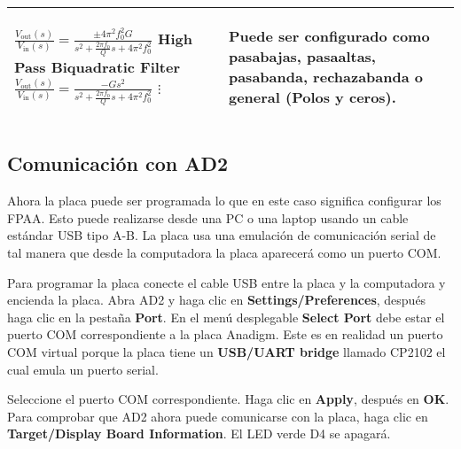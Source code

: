 \begin{table}[!ht]
\begin{tabular}{>{\centering\arraybackslash}m{3cm} >{\centering\arraybackslash}m{5cm} >{\centering\arraybackslash}m{5cm}}
\begin{scriptsize}
      	 $\frac{V_{\mathrm{out}}(s)}{V_{\mathrm{in}}(s)} = \frac{\pm 4 \pi^{2} f_{0}^{2} G}{s^{2} + \frac{2 \pi f_{0}}{Q}s + 4 \pi^{2} f_{0}^{2}}$ \linebreak
      	 \textbf{High Pass Biquadratic Filter} \linebreak
      	 $\frac{V_{\mathrm{out}}(s)}{V_{\mathrm{in}}(s)} = \frac{-G s^{2}}{s^{2} + \frac{2 \pi f_{0}}{Q} s + 4 \pi^{2} f_{0}^{2}}$ \linebreak
      	 $\vdots$
      \end{scriptsize}
    & 
      \begin{itemize}[leftmargin=0cm,noitemsep]
      \begin{scriptsize}
		\item[] Puede ser configurado como pasabajas, pasaaltas, pasabanda, rechazabanda o general (Polos y ceros).
      \end{scriptsize}
      \end{itemize}
    \\ %
    \hline
  \end{tabular}
\end{table}
	
	\subsection{Comunicación con AD2}

Ahora la placa puede ser programada lo que en este caso significa configurar los FPAA. Esto puede realizarse desde una PC o una laptop usando un cable estándar USB tipo A-B. La placa usa una emulación de comunicación serial de tal manera que  desde la computadora la placa aparecerá como un puerto COM.

Para programar la placa conecte el cable USB entre la placa y la computadora y encienda la placa. Abra AD2 y haga clic en \textbf{Settings/Preferences}, después haga clic en la pestaña \textbf{Port}. En el menú desplegable \textbf{Select Port} debe estar el puerto COM correspondiente a la placa Anadigm. Este es en realidad un puerto COM virtual porque la placa tiene un \textbf{USB/UART bridge} llamado CP2102 el cual emula un puerto serial. 

Seleccione el puerto COM correspondiente. Haga clic en \textbf{Apply}, después en \textbf{OK}. Para comprobar que AD2 ahora puede comunicarse con la placa, haga clic en \textbf{Target/Display Board Information}. El LED verde D4 se apagará.

